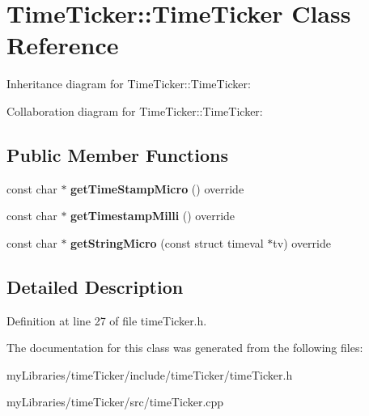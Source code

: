 \hypertarget{classTimeTicker_1_1TimeTicker}{}\section{Time\+Ticker\+::Time\+Ticker Class Reference}
\label{classTimeTicker_1_1TimeTicker}


Inheritance diagram for Time\+Ticker\+::Time\+Ticker\+:


Collaboration diagram for Time\+Ticker\+::Time\+Ticker\+:
\subsection*{Public Member Functions}
\begin{DoxyCompactItemize}
\item 
\mbox{\label{classTimeTicker_1_1TimeTicker_ab19bf0adbf52c7653dcb109151203048}} 
const char $\ast$ {\bfseries get\+Time\+Stamp\+Micro} () override
\item 
\mbox{\label{classTimeTicker_1_1TimeTicker_ab59e11c7abb09803b80b41ac21202c56}} 
const char $\ast$ {\bfseries get\+Timestamp\+Milli} () override
\item 
\mbox{\label{classTimeTicker_1_1TimeTicker_a4ca285bb5f74c233e2b76dc0fd64d339}} 
const char $\ast$ {\bfseries get\+String\+Micro} (const struct timeval $\ast$tv) override
\end{DoxyCompactItemize}


\subsection{Detailed Description}


Definition at line 27 of file time\+Ticker.\+h.



The documentation for this class was generated from the following files\+:\begin{DoxyCompactItemize}
\item 
my\+Libraries/time\+Ticker/include/time\+Ticker/time\+Ticker.\+h\item 
my\+Libraries/time\+Ticker/src/time\+Ticker.\+cpp\end{DoxyCompactItemize}
